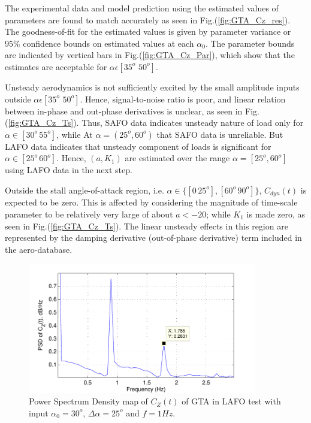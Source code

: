\documentclass{AIAA}
\begin{document}



The experimental data and model prediction using the estimated values of parameters are found to match accurately as seen in Fig.(\ref{fig:GTA_Cz_res}). The goodness-of-fit for the estimated values is given by parameter variance or $95\%$ confidence bounds on estimated values at each $\alpha_0$. The parameter bounds are indicated by vertical bars in Fig.(\ref{fig:GTA_Cz_Par}), which show that the estimates are acceptable for $\alpha \epsilon [35^o \, \, 50^o]$. 

Unsteady aerodynamics is not sufficiently excited by the small amplitude inputs outside $\alpha \epsilon [35^o \, \, 50^o]$. Hence, signal-to-noise ratio is poor, and linear relation between in-phase and out-phase derivatives is unclear, as seen in Fig.(\ref{fig:GTA_Cz_Ts}). Thus, SAFO data indicates unsteady nature of load only for $\alpha \in [30^o \, 55^o]$, while At $\alpha=(25^o,60^o)$ that SAFO data is unreliable. But LAFO data indicates that unsteady component of loads is significant for $\alpha \in [25^o \, 60^o]$. Hence, $(a,K_1)$ are estimated over the range $\alpha=[25^o , 60^o]$ using LAFO data in the next step.

Outside the stall angle-of-attack region, i.e. $\alpha \in \{[0 \, 25^o] ,[60^o \, 90^o]\}$, $C_{dyn}(t)$ is expected to be zero. This is affected by considering the magnitude of time-scale parameter to be relatively very large of about $a<-20$; while $K_1$ is made zero, as seen in Fig.(\ref{fig:GTA_Cz_Ts}). The linear unsteady effects in this region are represented by the damping derivative (out-of-phase derivative) term included in the aero-database.

\begin{figure}
\centering
\includegraphics[width=100mm]{Cz_PSD_83_raw}
\caption{Power Spectrum Density map of $C_Z(t)$ of GTA in LAFO test with input $\alpha_0=30^o$, $\Delta \alpha = 25^o$ and $f=1 Hz$.}
\label{fig:GTA_Cz_psd}
\end{figure}
\end{document}
